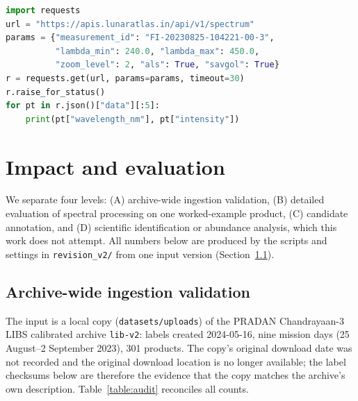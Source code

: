 \documentclass[final,5p,twocolumn,a4paper]{elsarticle}
\begin{document}
\begin{lstlisting}[language=Python, caption=Python client request for a downsampled spectrum (public demonstration deployment), label=lst:api]
import requests
url = "https://apis.lunaratlas.in/api/v1/spectrum"
params = {"measurement_id": "FI-20230825-104221-00-3",
          "lambda_min": 240.0, "lambda_max": 450.0,
          "zoom_level": 2, "als": True, "savgol": True}
r = requests.get(url, params=params, timeout=30)
r.raise_for_status()
for pt in r.json()["data"][:5]:
    print(pt["wavelength_nm"], pt["intensity"])
\end{lstlisting}

\section{Impact and evaluation}

We separate four levels: (A) archive-wide ingestion validation, (B) detailed evaluation of spectral processing on one worked-example product, (C) candidate annotation, and (D) scientific identification or abundance analysis, which this work does not attempt. All numbers below are produced by the scripts and settings in \texttt{revision\_v2/} from one input version (Section~\ref{subsec:archive}).

\subsection{Archive-wide ingestion validation}
\label{subsec:archive}

The input is a local copy (\texttt{datasets/uploads}) of the PRADAN Chandrayaan-3 LIBS calibrated archive \texttt{lib-v2}: labels created 2024-05-16, nine mission days (25 August--2 September 2023), 301 products. The copy's original download date was not recorded and the original download location is no longer available; the label checksums below are therefore the evidence that the copy matches the archive's own description. Table~\ref{table:audit} reconciles all counts.
\end{document}
